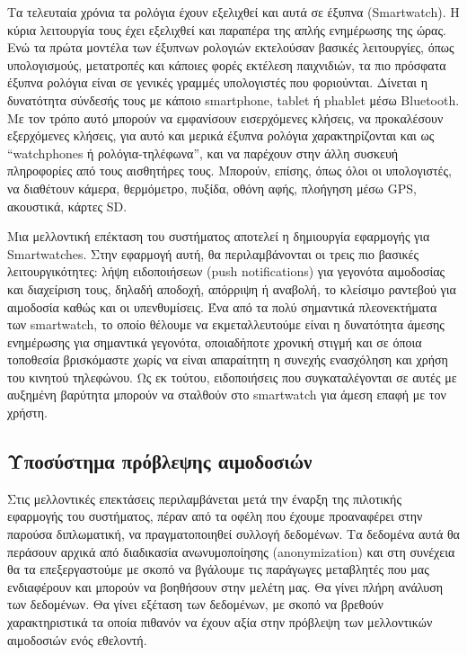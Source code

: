 	
		Τα τελευταία χρόνια τα ρολόγια έχουν εξελιχθεί και αυτά σε έξυπνα (Smartwatch). Η κύρια λειτουργία τους έχει εξελιχθεί και παραπέρα της απλής ενημέρωσης της ώρας. Ενώ τα πρώτα μοντέλα των έξυπνων ρολογιών εκτελούσαν βασικές λειτουργίες, όπως υπολογισμούς, μετατροπές και κάποιες φορές εκτέλεση παιχνιδιών, τα πιο πρόσφατα έξυπνα ρολόγια είναι σε γενικές γραμμές υπολογιστές που φοριούνται. Δίνεται η δυνατότητα σύνδεσής τους με κάποιο smartphone, tablet ή phablet μέσω Bluetooth. Με τον τρόπο αυτό μπορούν να εμφανίσουν εισερχόμενες κλήσεις, να προκαλέσουν εξερχόμενες κλήσεις, για αυτό και μερικά έξυπνα ρολόγια χαρακτηρίζονται και ως “watchphones ή ρολόγια-τηλέφωνα”, και να παρέχουν στην άλλη συσκευή πληροφορίες από τους αισθητήρες τους. Μπορούν, επίσης, όπως όλοι οι υπολογιστές, να διαθέτουν κάμερα, θερμόμετρο, πυξίδα, οθόνη αφής, πλοήγηση μέσω GPS, ακουστικά, κάρτες SD.	
	
	
	Μια μελλοντική επέκταση του συστήματος αποτελεί η δημιουργία εφαρμογής για Smartwatches. Στην εφαρμογή αυτή, θα περιλαμβάνονται οι τρεις πιο βασικές λειτουργικότητες: λήψη ειδοποιήσεων (push notifications) για γεγονότα αιμοδοσίας και διαχείριση τους, δηλαδή αποδοχή, απόρριψη ή αναβολή, το κλείσιμο ραντεβού για αιμοδοσία καθώς και οι υπενθυμίσεις. Ένα από τα πολύ σημαντικά πλεονεκτήματα των smartwatch, το οποίο θέλουμε να εκμεταλλευτούμε είναι η δυνατότητα άμεσης ενημέρωσης για σημαντικά γεγονότα, οποιαδήποτε χρονική στιγμή και σε όποια τοποθεσία βρισκόμαστε χωρίς να είναι απαραίτητη η συνεχής ενασχόληση και χρήση του κινητού τηλεφώνου. Ως εκ τούτου, ειδοποιήσεις που συγκαταλέγονται σε αυτές με αυξημένη βαρύτητα μπορούν να σταλθούν στο smartwatch για άμεση επαφή με τον χρήστη.
	
	
	
	
	\subsection{Υποσύστημα πρόβλεψης αιμοδοσιών}
		
		Στις μελλοντικές επεκτάσεις περιλαμβάνεται  μετά την έναρξη της πιλοτικής εφαρμογής του συστήματος, πέραν από τα οφέλη που έχουμε προαναφέρει στην παρούσα διπλωματική, να πραγματοποιηθεί συλλογή δεδομένων. Τα δεδομένα αυτά θα περάσουν αρχικά από διαδικασία ανωνυμοποίησης (anonymization) και στη συνέχεια θα τα επεξεργαστούμε με σκοπό να βγάλουμε τις παράγωγες μεταβλητές που μας ενδιαφέρουν και μπορούν να βοηθήσουν στην μελέτη μας. Θα γίνει πλήρη ανάλυση των δεδομένων. Θα γίνει εξέταση των δεδομένων, με σκοπό να βρεθούν χαρακτηριστικά τα οποία πιθανόν να έχουν αξία στην πρόβλεψη των μελλοντικών αιμοδοσιών ενός εθελοντή.
		
